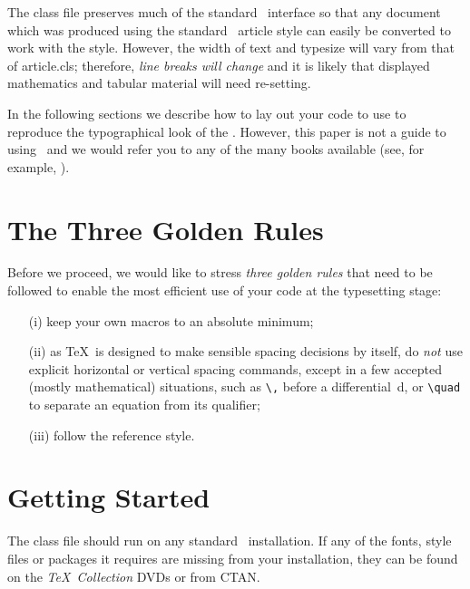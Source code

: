 \documentclass[times]{fldauth}
\begin{document}
The \textsf{\journalclass} class file preserves much of the
standard \LaTeXe\ interface so that any document which was
produced using the standard \LaTeXe\ \textsf{article} style can
easily be converted to work with the \textsf{\journalclassshort}
style. However, the width of text and typesize will vary from that
of \textsf{article.cls}; therefore, \emph{line breaks will change}
and it is likely that displayed mathematics and tabular material
will need re-setting.

In the following sections we describe how to lay out your code to
use \textsf{\journalclass} to reproduce the typographical look of
the \emph{\journalnamelc}. However, this paper is not a guide to
using \LaTeXe\ and we would refer you to any of the many books
available (see, for example, \cite{R1,R2,R3}).

\vspace{-6pt}

\section{The Three Golden Rules}
\vspace{-2pt}

Before we proceed, we would like to stress \emph{three golden
rules} that need to be followed to enable the most efficient use
of your code at the typesetting stage:
\begin{enumerate}
\item[(i)] keep your own macros to an absolute minimum;

\item[(ii)] as \TeX\ is designed to make sensible spacing
decisions by itself, do \emph{not} use explicit horizontal or
vertical spacing commands, except in a few accepted (mostly
mathematical) situations, such as \verb"\," before a
differential~d, or \verb"\quad" to separate an equation from its
qualifier;

\item[(iii)] follow the \emph{\journalnamelc} reference style.
\end{enumerate}

\pagebreak

\section{Getting Started} The \textsf{\journalclassshort} class file should run
on any standard \LaTeXe\ installation. If any of the fonts, style
files or packages it requires are missing from your installation,
they can be found on the \emph{\TeX\ Collection} DVDs or from
CTAN.
\end{document}
